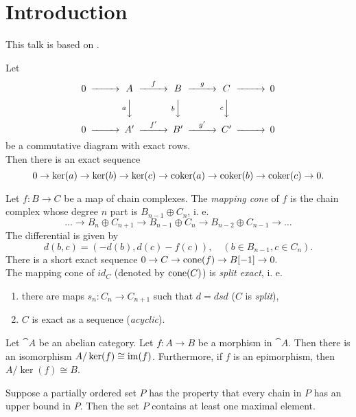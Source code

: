 \section{Introduction}
This talk is based on \cite{Wei94}.

\begin{note}\label{snake_lemma}
	Let
	\begin{align*}
		\begin{CD}
			0 @>>> A @>f>> B @>g>> C @>>> 0 \\
			@.   @VaVV   @VbVV    @VcVV    @. \\
			0 @>>> A' @>f'>> B' @>g'>> C' @>>> 0
		\end{CD}
	\end{align*}
	be a commutative diagram with exact rows. \\
	Then there is an exact sequence
	$$0 \rightarrow \ker(a) \rightarrow \ker(b) \rightarrow \ker(c) \rightarrow \operatorname{coker}(a) \rightarrow \operatorname{coker}(b) \rightarrow \operatorname{coker}(c) \rightarrow 0.$$
\end{note}

\begin{definition}
	Let $f:B \rightarrow C$ be a map of chain complexes.
	The \textit{mapping cone} of $f$ is the chain complex whose degree $n$ part is $B_{n-1} \oplus C_n$, i. e.
	\[\dots \rightarrow B_{n} \oplus C_{n+1} \rightarrow B_{n-1} \oplus C_n \rightarrow B_{n-2} \oplus C_{n-1} \rightarrow \dots\]
	The differential is given by
	\[d(b,c) = (-d(b), d(c) - f(c)), \quad (b\in B_{n-1}, c\in C_n).\]
	There is a short exact sequence $0 \rightarrow C \rightarrow \operatorname{cone}(f) \rightarrow B[-1] \rightarrow 0.$ \\
	The mapping cone of $id_C$ (denoted by $\operatorname{cone}(C)$) is \textit{split exact}, i. e.
	\begin{enumerate}[label=(\roman*)]
		\item there are maps $s_n:C_n\rightarrow C_{n+1}$ such that $d=dsd$ ($C$ is \textit{split}),
		\item $C$ is exact as a sequence (\textit{acyclic}).
	\end{enumerate} 
\end{definition}

\begin{note} \label{FTH}
	Let $\cat{A}$ be an abelian category. Let $f:A \rightarrow B$ be a morphism in $\cat{A}$.
	Then there is an isomorphism $A / \ker(f) \cong \operatorname{im}(f)$.
	Furthermore, if $f$ is an epimorphism, then $A / \ker(f) \cong B$.
\end{note}

\begin{note} \label{zorn}
	 Suppose a partially ordered set $P$ has the property that every chain in $P$ has an upper bound in $P$. Then the set $P$ contains at least one maximal element. 
\end{note}